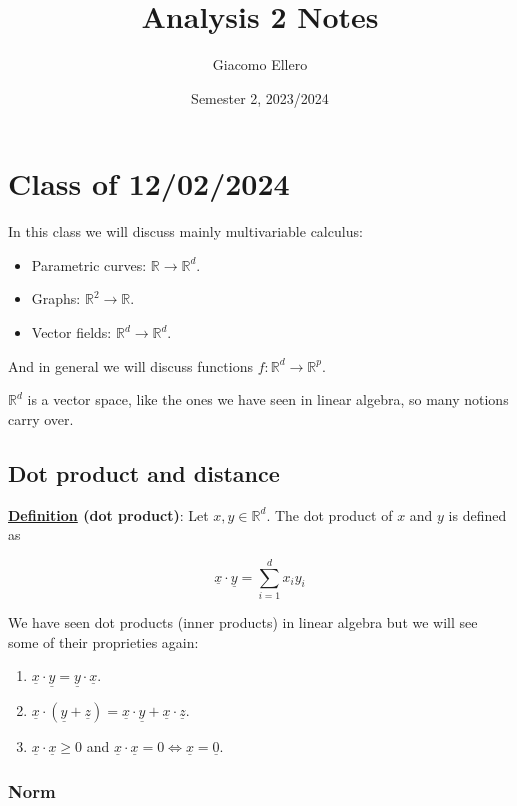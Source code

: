 \documentclass[10pt]{extarticle}
\title{Analysis 2 Notes}
\author{Giacomo Ellero}
\date{Semester 2, 2023/2024}
\newcommand{\R}{\mathbb{R}}
\begin{document}
\maketitle
\tableofcontents
\clearpage

\section{Class of 12/02/2024}

In this class we will discuss mainly multivariable calculus:
\begin{itemize}
    \item Parametric curves: $\R \to \R^d$.
    \item Graphs: $\R^2 \to \R$.
    \item Vector fields: $\R^d \to \R^d$.
\end{itemize}

And in general we will discuss functions $f: \R^d \to \R^p$.

$\R^d$ is a vector space, like the ones we have seen in linear algebra, so many notions carry over.

\subsection{Dot product and distance}

\textbf{\underline{Definition} (dot product)}: Let $x, y \in \R^d$. The dot product of $x$ and $y$ is defined as

$$
    \underline{x} \cdot \underline{y} = \sum_{i=1}^d x_i y_i
$$

We have seen dot products (inner products) in linear algebra but we will see some of their proprieties again:
\begin{enumerate}
    \item $\underline{x} \cdot \underline{y} = \underline{y} \cdot \underline{x}$.
    \item $\underline{x} \cdot (\underline{y} + \underline{z}) = \underline{x} \cdot \underline{y} + \underline{x} \cdot \underline{z}$.
    \item $\underline{x} \cdot \underline{x} \geq 0$ and $\underline{x} \cdot \underline{x} = 0 \iff \underline{x} = \underline{0}$.
\end{enumerate}

\subsubsection{Norm}
\end{document}
